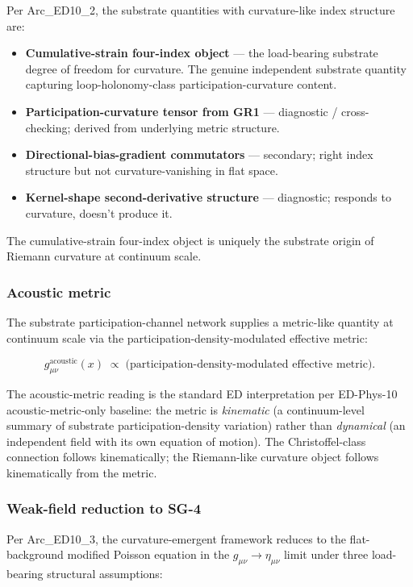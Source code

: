 \documentclass[
]{article}
\providecommand{\tightlist}{%
  \setlength{\itemsep}{0pt}\setlength{\parskip}{0pt}}
\begin{document}
Per Arc\_ED10\_2, the substrate quantities with curvature-like index
structure are:

\begin{itemize}
\tightlist
\item
  \textbf{Cumulative-strain four-index object} --- the load-bearing
  substrate degree of freedom for curvature. The genuine independent
  substrate quantity capturing loop-holonomy-class
  participation-curvature content.
\item
  \textbf{Participation-curvature tensor from GR1} --- diagnostic /
  cross-checking; derived from underlying metric structure.
\item
  \textbf{Directional-bias-gradient commutators} --- secondary; right
  index structure but not curvature-vanishing in flat space.
\item
  \textbf{Kernel-shape second-derivative structure} --- diagnostic;
  responds to curvature, doesn't produce it.
\end{itemize}

The cumulative-strain four-index object is uniquely the substrate origin
of Riemann curvature at continuum scale.

\subsubsection{Acoustic metric}\label{acoustic-metric}

The substrate participation-channel network supplies a metric-like
quantity at continuum scale via the participation-density-modulated
effective metric:

\[g_{\mu\nu}^\mathrm{acoustic}(x) \;\propto\; \bigl(\text{participation-density-modulated effective metric}\bigr).\]

The acoustic-metric reading is the standard ED interpretation per
ED-Phys-10 acoustic-metric-only baseline: the metric is \emph{kinematic}
(a continuum-level summary of substrate participation-density variation)
rather than \emph{dynamical} (an independent field with its own equation
of motion). The Christoffel-class connection follows kinematically; the
Riemann-like curvature object follows kinematically from the metric.

\subsubsection{Weak-field reduction to
SG-4}\label{weak-field-reduction-to-sg-4}

Per Arc\_ED10\_3, the curvature-emergent framework reduces to the
flat-background modified Poisson equation in the
\(g_{\mu\nu}\to\eta_{\mu\nu}\) limit under three load-bearing structural
assumptions:
\end{document}
